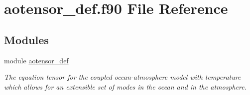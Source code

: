 \hypertarget{aotensor__def_8f90}{}\section{aotensor\+\_\+def.\+f90 File Reference}
\label{aotensor__def_8f90}
\subsection*{Modules}
\begin{DoxyCompactItemize}
\item 
module \hyperlink{namespaceaotensor__def}{aotensor\+\_\+def}
\begin{DoxyCompactList}\small\item\em The equation tensor for the coupled ocean-\/atmosphere model with temperature which allows for an extensible set of modes in the ocean and in the atmosphere. \end{DoxyCompactList}\end{DoxyCompactItemize}
